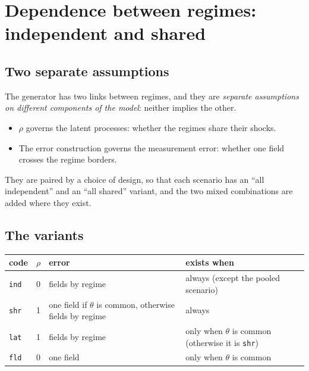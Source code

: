 \documentclass[11pt]{article}
\begin{document}
\section{Dependence between regimes: independent and shared}\label{sec:variants}

\subsection{Two separate assumptions}

The generator has two links between regimes, and they are \emph{separate assumptions on different components of the model}: neither implies the other.
\begin{itemize}[leftmargin=1.5em]
  \item $\rho$ governs the latent processes: whether the regimes share their shocks.
  \item The error construction governs the measurement error: whether one field crosses the regime borders.
\end{itemize}
They are paired by a choice of design, so that each scenario has an ``all independent'' and an ``all shared'' variant, and the two mixed combinations are added where they exist.

\subsection{The variants}

\begin{center}
\begin{tabular}{ll>{\raggedright\arraybackslash}p{5.4cm}>{\raggedright\arraybackslash}p{4.6cm}}
\toprule
code & $\rho$ & error & exists when \\
\midrule
\texttt{ind} & 0 & fields by regime & always (except the pooled scenario) \\
\texttt{shr} & 1 & one field if $\theta$ is common, otherwise fields by regime & always \\
\texttt{lat} & 1 & fields by regime & only when $\theta$ is common (otherwise it is \texttt{shr}) \\
\texttt{fld} & 0 & one field & only when $\theta$ is common \\
\bottomrule
\end{tabular}
\end{center}
\end{document}
